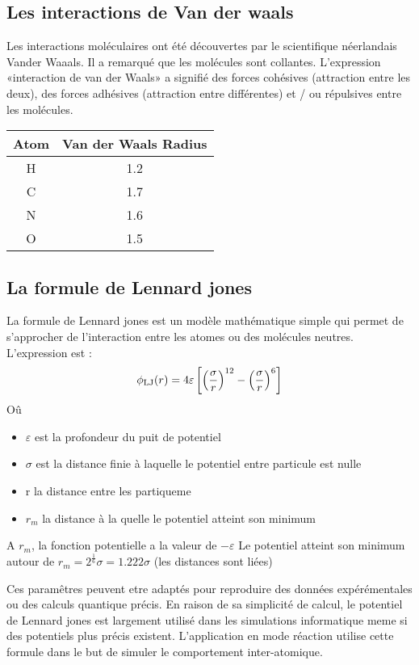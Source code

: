 \subsection{Les interactions de Van der waals}
Les interactions moléculaires ont été découvertes par le scientifique néerlandais Vander Waaals. Il a remarqué que les molécules sont collantes.
L'expression «interaction de van der Waals» a signifié des forces cohésives (attraction entre les deux), des forces adhésives (attraction entre différentes) et / ou répulsives entre les molécules.

\begin{table}[h!]
\centering
 \begin{tabular}{||c | c||} 
 \hline
 Atom & Van der Waals Radius \\ [0.5ex] 
 \hline\hline
 H & 1.2 \\ 
 \hline
 C & 1.7 \\
 \hline
 N & 1.6 \\
 \hline
 O & 1.5 \\
 \hline
 \end{tabular}
\end{table}
\subsection{La formule de Lennard jones }
La formule de Lennard jones est un modèle mathématique simple qui permet de s'approcher de l'interaction entre les atomes ou des molécules neutres. 
L'expression est :
 \begin{displaymath} \phi_{\rm LJ} (r) = 4\varepsilon \left[ \left(\frac{\sigma}{r}\right)^{12} - \left(\frac{\sigma}{r}\right)^{6} \right]\end{displaymath}
Oû 
\begin{itemize}
    \item $\varepsilon$ est la profondeur du puit de potentiel
    \item $\sigma$ est la distance finie à laquelle le potentiel entre particule est nulle
    \item r la distance entre les partiqueme
    \item $r_m$ la distance à la quelle le potentiel atteint son minimum 
\end{itemize}

A $r_m$, la fonction potentielle a la valeur de $-\varepsilon$
Le potentiel atteint son minimum autour de $r_m = 2^{\frac{1}{6}} \sigma = 1.222 \sigma$ (les distances sont liées)

Ces paramêtres peuvent etre adaptés pour reproduire  des données expérémentales ou des calculs quantique précis.
En raison de sa simplicité de calcul, le potentiel de Lennard jones est largement utilisé dans les simulations informatique meme si des potentiels plus précis existent.
L'application en mode réaction utilise cette formule dans le but de simuler le comportement inter-atomique.

